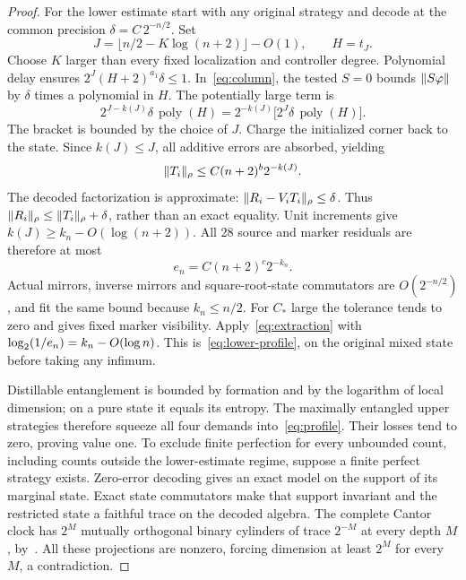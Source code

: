 \begin{proof}
For the lower estimate start with any original strategy and decode at the common precision $\delta=C\,2^{-n/2}$. Set
\[
 J=\lfloor n/2-K\log(n+2)\rfloor-O(1),\qquad H=t_J.
\]
Choose $K$ larger than every fixed localization and controller degree. Polynomial delay ensures $2^J(H+2)^{a_1}\delta\le1$. In~\eqref{eq:column}, the tested $S=0$ bounds $\lVert S\varphi\rVert$ by $\delta$ times a polynomial in $H$. The potentially large term is
\[
 2^{J-k(J)}\delta\,\operatorname{poly}(H)
 =2^{-k(J)}\bigl[2^J\delta\,\operatorname{poly}(H)\bigr].
\]
The bracket is bounded by the choice of $J$. Charge the initialized corner back to the state. Since $k(J)\le J$, all additive errors are absorbed, yielding
\[
 \lVert T_i\rVert_\rho\le C(n+2)^b2^{-k(J)}.
\]
The decoded factorization is approximate: $\lVert R_i-V_iT_i\rVert_\rho\le\delta$. Thus $\lVert R_i\rVert_\rho\le\lVert T_i\rVert_\rho+\delta$, rather than an exact equality. Unit increments give $k(J)\ge k_n-O(\log(n+2))$. All 28 source and marker residuals are therefore at most
\[
 e_n=C(n+2)^c2^{-k_n}.
\]
Actual mirrors, inverse mirrors and square-root-state commutators are $O(2^{-n/2})$, and fit the same bound because $k_n\le n/2$. For $C_*$ large the tolerance tends to zero and gives fixed marker visibility. Apply~\eqref{eq:extraction} with $\log_2(1/e_n)=k_n-O(\log n)$. This is~\eqref{eq:lower-profile}, on the original mixed state before taking any infimum.

Distillable entanglement is bounded by formation and by the logarithm of local dimension; on a pure state it equals its entropy. The maximally entangled upper strategies therefore squeeze all four demands into~\eqref{eq:profile}. Their losses tend to zero, proving value one. To exclude finite perfection for every unbounded count, including counts outside the lower-estimate regime, suppose a finite perfect strategy exists. Zero-error decoding gives an exact model on the support of its marginal state. Exact state commutators make that support invariant and the restricted state a faithful trace on the decoded algebra. The complete Cantor clock has $2^M$ mutually orthogonal binary cylinders of trace $2^{-M}$ at every depth $M$, by~\cite[Lemma 4.1, fair-cylinder identity (4.3)]{UP}. All these projections are nonzero, forcing dimension at least $2^M$ for every $M$, a contradiction.
\end{proof}

